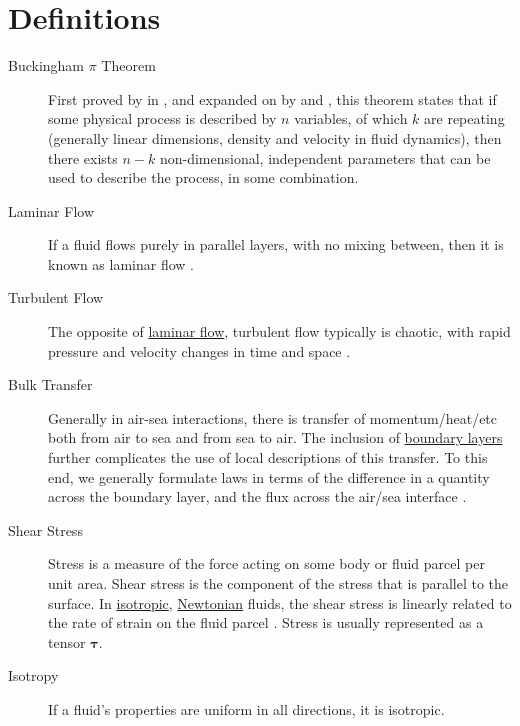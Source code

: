 \documentclass{report}
\begin{document}
\section{Definitions}
\label{definitions}
\begin{description}
\item[Buckingham $\pi$ Theorem] First proved by \citeauthor{bertrand78} in \citeyear{bertrand78}, and expanded on by \citet{rayleigh92} and \citet{buckingham14}, this theorem states that if some physical process is described by $n$ variables, of which $k$ are repeating (generally linear dimensions, density and velocity in fluid dynamics), then there exists $n-k$ non-dimensional, independent parameters that can be used to describe the process, in some combination.\label{buckingham}

\item[Laminar Flow] If a fluid flows purely in parallel layers, with no mixing between, then it is known as laminar flow \citep{batchelor00}.\label{laminar}

\item[Turbulent Flow] The opposite of \hyperref[laminar]{laminar flow}, turbulent flow typically is chaotic, with rapid pressure and velocity changes in time and space \citep{batchelor00}.\label{turbulent}

\item[Bulk Transfer] Generally in air-sea interactions, there is transfer of momentum/heat/etc both from air to sea and from sea to air.
The inclusion of \hyperref[def:boundarylayer]{boundary layers} further complicates the use of local descriptions of this transfer.
To this end, we generally formulate laws in terms of the difference in a quantity across the boundary layer, and the flux across the air/sea interface \citep{csanady04}. \label{bulk}

\item[Shear Stress] Stress is a measure of the force acting on some body or fluid parcel per unit area.
Shear stress is the component of the stress that is parallel to the surface.
In \hyperref[def:isotropic]{isotropic}, \hyperref[def:newtonian]{Newtonian} fluids, the shear stress is linearly related to the rate of strain on the fluid parcel \citep{schlichting79}.
Stress is usually represented as a tensor $\bm{\tau}$.\label{def:shearstress}

\item[Isotropy] If a fluid's properties are uniform in all directions, it is isotropic.\label{def:isotropic}


\end{description}
\end{document}
